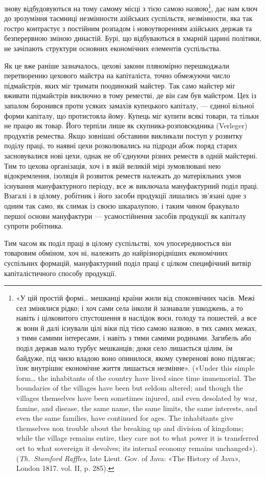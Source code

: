 \parcont{}  %
знову відбудовуються на тому самому місці з тією самою назвою\footnote{
«У цій простій формі\dots{} мешканці країни жили від споконвічних
часів. Межі сел змінялися рідко; і хоч сами села інколи й зазнавали
ушкоджень, а то навіть і цілковитого спустошення в наслідок воєн,
голоду та пошестей, а все ж вони й далі існували цілі віки під тією самою
назвою, в тих самих межах, з тими самими інтересами, і навіть з тими
самими родинами. Загибель або поділ держав мало турбує мешканців;
доки село лишається цілим, їм байдуже, під чиєю владою воно опинилося,
якому суверенові воно підлягає; їхнє внутрішнє економічне життя
лишається незмінне». («Under this simple form\dots{} the inhabitants of the
country have lived since time immemorial. The boundaries of the villages
have been but seldom altered; and though the villages themselves have
been sometimes injured, and even desolated by war, famine, and disease,
the same name, the same limits, the same interests, and even the same
families, have continued for ages. The inhabitants give themselves non
trouble about the breaking up and division of kingdoms; while the village
remains entire, they care not to what power it is transferred ort to what
sovereign it devolves; its internal economy remains unchanged»). (\emph{Th.~Stamford
Raffles}, late Lieut. Gov. of Java: «The History of Java», London 1817.
vol. II, p. 285).
}, дає нам ключ до зрозуміння таємниці незмінности азійських
суспільств, незмінности, яка так гостро контрастує з постійним
розпадом і новоутворенням азійських держав та безперервною
зміною династій. Бурі, що відбуваються в хмарній царині політики,
не зачіпають структури основних економічних елементів
суспільства.

Як це вже раніше зазначалось, цехові закони пляномірно
перешкоджали перетворенню цехового майстра на капіталіста,
точно обмежуючи число підмайстрів, яких міг тримати поодинокий
майстер. Так само майстер міг вживати підмайстрів виключно
в тому реместві, де він сам був майстром. Цех із запалом
боронився проти усяких замахів купецького капіталу, —
єдиної вільної форми капіталу, що протистояла йому. Купець
міг купити всякі товари, та тільки не працю як товар. Його терпіли
лише як скупника-розповсюдника (Verleger) продуктів
ремества. Якщо зовнішні обставини викликали поступ у розвитку
поділу праці, то наявні цехи розколювались на підроди абож
поряд старих засновувалися нові цехи, однак не об’єднуючи різних
реместв в одній майстерні. Тим то цехова організація, хоч і в
якій великій мірі зумовлювані нею відокремлення, ізоляція й
розвиток реместв належать до матеріяльних умов існування
мануфактурного періоду, все ж виключала мануфактурний поділ
праці. Взагалі і в цілому, робітник і його засоби продукції
лишались зв’язані одне з одним так само, як слимак із своєю
шкаралупою, і таким чином бракувало першої основи мануфактури
— усамостійнення засобів продукції як капіталу супроти
робітника.

Тим часом як поділ праці в цілому суспільстві, хоч упосереднюється
він товаровим обміном, хоч ні, належить до найрізнорідніших
економічних суспільних формацій, мануфактурний
поділ праці є цілком специфічний витвір капіталістичного способу
продукції.
